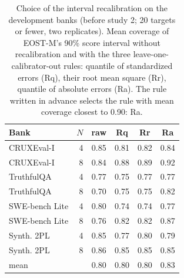 \begin{table}[tbp]
\centering\footnotesize
\caption{Choice of the interval recalibration on the development banks (before study 2; 20 targets or fewer, two replicates). Mean coverage of EOST-M's 90\% score interval without recalibration and with the three leave-one-calibrator-out rules: quantile of standardized errors (Rq), their root mean square (Rr), quantile of absolute errors (Ra). The rule written in advance selects the rule with mean coverage closest to 0.90: Ra.}
\label{tab:devrule}
\begin{tabular}{@{}lrcccc@{}}
\toprule
Bank & $N$ & raw & Rq & Rr & Ra \\
\midrule
CRUXEval-I & 4 & 0.85 & 0.81 & 0.82 & 0.84 \\
CRUXEval-I & 8 & 0.84 & 0.88 & 0.89 & 0.92 \\
TruthfulQA & 4 & 0.77 & 0.75 & 0.77 & 0.77 \\
TruthfulQA & 8 & 0.70 & 0.75 & 0.75 & 0.82 \\
SWE-bench Lite & 4 & 0.80 & 0.74 & 0.74 & 0.77 \\
SWE-bench Lite & 8 & 0.76 & 0.82 & 0.82 & 0.87 \\
Synth. 2PL & 4 & 0.85 & 0.77 & 0.80 & 0.79 \\
Synth. 2PL & 8 & 0.86 & 0.85 & 0.85 & 0.85 \\
\midrule
mean & & 0.80 & 0.80 & 0.80 & 0.83 \\
\bottomrule
\end{tabular}
\end{table}
